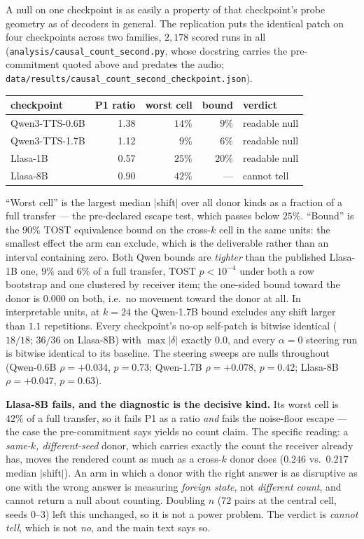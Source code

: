\documentclass[11pt]{article}
\begin{document}
A null on one checkpoint is as easily a property of that checkpoint's probe
geometry as of decoders in general. The replication puts the identical patch on
four checkpoints across two families, $2{,}178$ scored runs in all
(\texttt{analysis/causal\_count\_second.py}, whose docstring carries the
pre-commitment quoted above and predates the audio;
\texttt{data/results/causal\_count\_second\_checkpoint.json}).

\begin{center}
\begin{tabular}{@{}lrrrl@{}}
\toprule
checkpoint & P1 ratio & worst cell & bound & verdict \\
\midrule
Qwen3-TTS-0.6B & 1.38 & $14\%$ & $9\%$  & readable null \\
Qwen3-TTS-1.7B & 1.12 & $9\%$  & $6\%$  & readable null \\
Llasa-1B       & 0.57 & $25\%$ & $20\%$ & readable null \\
Llasa-8B       & 0.90 & $42\%$ & ---    & cannot tell \\
\bottomrule
\end{tabular}
\end{center}

\noindent ``Worst cell'' is the largest median $|$shift$|$ over all donor kinds
as a fraction of a full transfer --- the pre-declared escape test, which passes
below $25\%$. ``Bound'' is the $90\%$ TOST equivalence bound on the cross-$k$
cell in the same units: the smallest effect the arm can exclude, which is the
deliverable rather than an interval containing zero. Both Qwen bounds are
\emph{tighter} than the published Llasa-1B one, $9\%$ and $6\%$ of a full
transfer, TOST $p<10^{-4}$ under both a row bootstrap and one clustered by
receiver item; the one-sided bound toward the donor is $0.000$ on both, i.e.\
no movement toward the donor at all. In interpretable units, at $k{=}24$ the
Qwen-1.7B bound excludes any shift larger than $1.1$ repetitions. Every
checkpoint's no-op self-patch is bitwise identical ($18/18$; $36/36$ on
Llasa-8B) with $\max|\delta|$ exactly $0.0$, and every $\alpha{=}0$ steering run
is bitwise identical to its baseline. The steering sweeps are nulls throughout
(Qwen-0.6B $\rho{=}{+}0.034$, $p{=}0.73$; Qwen-1.7B $\rho{=}{+}0.078$,
$p{=}0.42$; Llasa-8B $\rho{=}{+}0.047$, $p{=}0.63$).

\textbf{Llasa-8B fails, and the diagnostic is the decisive kind.} Its worst
cell is $42\%$ of a full transfer, so it fails P1 as a ratio \emph{and} fails
the noise-floor escape --- the case the pre-commitment says yields no count
claim. The specific reading: a \emph{same-$k$, different-seed} donor, which
carries exactly the count the receiver already has, moves the rendered count as
much as a cross-$k$ donor does ($0.246$ vs.\ $0.217$ median $|$shift$|$). An arm
in which a donor with the right answer is as disruptive as one with the wrong
answer is measuring \emph{foreign state}, not \emph{different count}, and cannot
return a null about counting. Doubling $n$ (72 pairs at the central cell, seeds
0--3) left this unchanged, so it is not a power problem. The verdict is
\emph{cannot tell}, which is not \emph{no}, and the main text says so.
\end{document}

